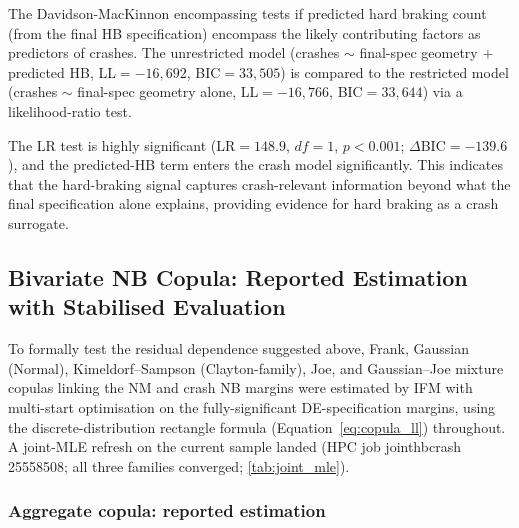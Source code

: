 \documentclass[letterpaper,8pt]{extarticle}  %
\newcommand{\file}[1]{{\ttfamily\def\_{\textunderscore\allowbreak}#1}}
\begin{document}
\begin{doublespacing}
\begin{linenumbers}
The Davidson-MacKinnon encompassing tests if predicted hard braking count (from the final HB specification) encompass the likely contributing factors as predictors of crashes. The unrestricted model (crashes $\sim$ final-spec geometry $+$ predicted HB, LL$=-16{,}692$, BIC$=33{,}505$) is compared to the restricted model (crashes $\sim$ final-spec geometry alone, LL$=-16{,}766$, BIC$=33{,}644$) via a likelihood-ratio test.

The LR test is highly significant (LR$=148.9$, $df=1$, $p<0.001$; $\Delta$BIC$=-139.6$), and the predicted-HB term enters the crash model significantly. This indicates that the hard-braking signal captures crash-relevant information beyond what the final specification alone explains, providing evidence for hard braking as a crash surrogate.



\FloatBarrier




\subsection{Bivariate NB Copula: Reported Estimation with Stabilised Evaluation}

To formally test the residual dependence suggested above, Frank, Gaussian (Normal), Kimeldorf--Sampson (Clayton-family), Joe, and Gaussian--Joe mixture copulas linking the NM and crash NB margins were estimated by IFM with multi-start optimisation on the fully-significant DE-specification margins, using the discrete-distribution rectangle formula (Equation~\ref{eq:copula_ll}) throughout. A joint-MLE refresh on the current sample landed (HPC job \file{joint\_hbcrash} 25558508; all three families converged; \cref{tab:joint_mle}).

\subsubsection{Aggregate copula: reported estimation}


\end{linenumbers}
\end{doublespacing}
\end{document}
